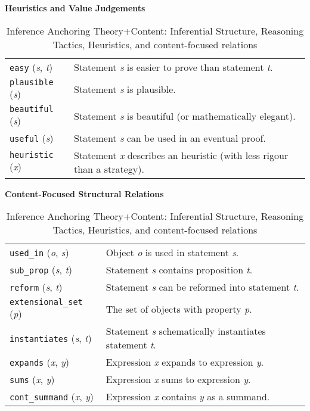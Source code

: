 \begin{table}[ht]
\begin{mdframed}
\medskip

{\centering
\textbf{Heuristics and Value Judgements}

\par}

\smallskip

\noindent
\begin{tabular}{@{\hspace{-.25ex}}p{}p{}}
\texttt{easy} (\emph{s}, \emph{t}) & Statement \emph{s} is easier to prove than statement \emph{t}.\\
\texttt{plausible} (\emph{s}) & Statement \emph{s} is plausible.\\
\texttt{beautiful} (\emph{s}) & Statement \emph{s} is beautiful (or mathematically elegant).\\
\texttt{useful} (\emph{s}) & Statement \emph{s} can be used in an eventual proof.\\
\texttt{heuristic} (\emph{x}) & Statement \emph{x} describes an heuristic (with less rigour than a strategy).\\
\end{tabular}

\medskip

{\centering
\textbf{Content-Focused Structural Relations}

\par}

\smallskip

\noindent
\begin{tabular}{@{\hspace{-.25ex}}p{}p{}}
\texttt{used\_in} (\emph{o}, \emph{s}) & Object \emph{o} is used in statement \emph{s}.\\
\texttt{sub\_prop} (\emph{s}, \emph{t}) & Statement \emph{s} contains proposition \emph{t}.\\
\texttt{reform} (\emph{s}, \emph{t}) & Statement \emph{s} can be reformed into statement \emph{t}.\\
\texttt{extensional\_set} (\emph{p}) & The set of objects with property \emph{p}.\\
\texttt{instantiates} (\emph{s}, \emph{t}) & Statement \emph{s} schematically instantiates statement \emph{t}. \\
\texttt{expands} (\emph{x}, \emph{y}) & Expression \emph{x} expands to expression \emph{y}.\\
\texttt{sums} (\emph{x}, \emph{y}) & Expression \emph{x} sums to expression \emph{y}. \\
\texttt{cont\_summand} (\emph{x}, \emph{y}) & Expression \emph{x} contains \emph{y} as a summand. \\
\end{tabular}
\end{mdframed}
\caption{Inference Anchoring Theory+Content: Inferential Structure, Reasoning Tactics, Heuristics, and content-focused relations\label{iatc-table}}
\end{table}
